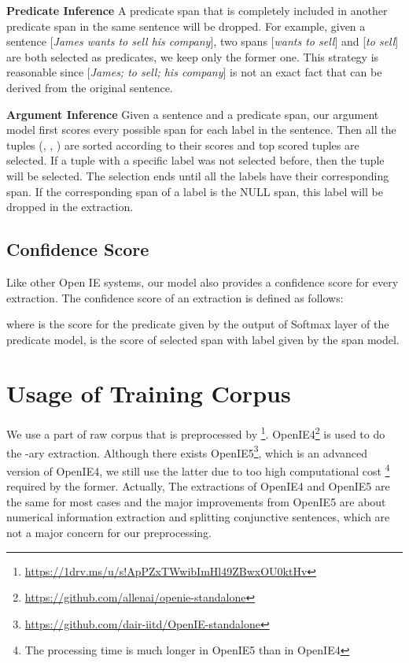 \documentclass[letterpaper]{article} \usepackage{aaai20}  \usepackage{times}  \usepackage{helvet} \usepackage{courier}  \usepackage[hyphens]{url}  \urlstyle{rm} \def\UrlFont{\rm}  \usepackage{graphicx}  \frenchspacing  \setlength{\pdfpagewidth}{8.5in}  \setlength{\pdfpageheight}{11in}
\begin{document}
\textbf{Predicate Inference} A predicate span that is completely included in another predicate span in the same sentence will be dropped. For example, given a sentence [\emph{James wants to sell his company}], two spans [\emph{wants to sell}] and [\emph{to sell}] are both selected as predicates, we keep only the former one. This strategy is reasonable since [\emph{James; to sell; his company}] is not an exact fact that can be derived from the original sentence.

\textbf{Argument Inference} Given a sentence and a predicate span, our argument model first scores every possible span for each label in the sentence. Then all the tuples (, , ) are sorted according to their scores and top scored tuples are selected. If a tuple with a specific label was not selected before, then the tuple will be selected. The selection ends until all the labels have their corresponding span. If the corresponding span of a label is the NULL span, this label will be dropped in the extraction.

 

\subsection{Confidence Score}
Like other Open IE systems, our model also provides a confidence score for every extraction. The confidence score  of an extraction is defined as follows:

where  is the score for the predicate given by the output of Softmax layer of the predicate model,  is the score of selected span with label  given by the span model.

\section{Usage of Training Corpus}
We use a part of raw corpus that is preprocessed by \cite{Cui2018NeuralOI}\footnote{\url{https://1drv.ms/u/s!ApPZxTWwibImHl49ZBwxOU0ktHv}}. OpenIE4\footnote{\url{https://github.com/allenai/openie-standalone}} is used to do the -ary extraction. Although there exists OpenIE5\footnote{\url{https://github.com/dair-iitd/OpenIE-standalone}}, which is an advanced version of OpenIE4, we still use the latter due to too high computational cost \footnote{The processing time is much longer in OpenIE5 than in OpenIE4} required by the former. Actually, The extractions of OpenIE4 and OpenIE5 are the same for most cases and the major improvements from OpenIE5 are about numerical information extraction and splitting conjunctive sentences, which are not a major concern for our preprocessing. 
\end{document}

